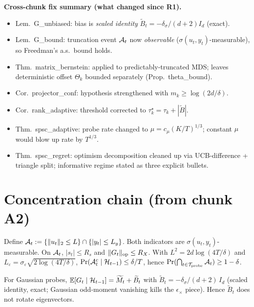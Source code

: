 \textbf{Cross-chunk fix summary (what changed since R1).}
\begin{itemize}[leftmargin=*,itemsep=1pt,topsep=1pt]
\item Lem.\ G\_unbiased: bias is \emph{scaled identity}
  $\widetilde B_t=-\delta_\sigma/(d+2)I_d$ (exact).
\item Lem.\ G\_bound: truncation event $\mathcal{A}_t$ now \emph{observable}
  ($\sigma(u_t,y_t)$-measurable), so Freedman's a.s.\ bound holds.
\item Thm.\ matrix\_bernstein: applied to predictably-truncated MDS;
  leaves deterministic offset $\Theta_k$ bounded separately
  (Prop.\ theta\_bound).
\item Cor.\ projector\_conf: hypothesis strengthened with
  $m_k\ge\log(2d/\delta)$.
\item Cor.\ rank\_adaptive: threshold corrected to
  $\tau_k^\star=\tau_k+|\widetilde B|$.
\item Thm.\ spsc\_adaptive: probe rate changed to
  $\mu=c_\mu(K/T)^{1/3}$; constant $\mu$ would blow up rate by $T^{1/3}$.
\item Thm.\ spsc\_regret: optimism decomposition cleaned up via
  UCB-difference + triangle split; informative regime stated as three
  explicit bullets.
\end{itemize}

\section{Concentration chain (from chunk A2)}

\begin{lemma}
\label{lem:G_bound}
Define $\mathcal{A}_t := \{\|u_t\|_2\le L\}\cap\{|y_t|\le L_y\}$. Both indicators
are $\sigma(u_t,y_t)$-measurable. On $\mathcal{A}_t$, $|s_t|\le R_s$ and
$\|G_t\|_{\mathrm{op}}\le R_X$. With $L^2=2d\log(4T/\delta)$ and
$L_\varepsilon=\sigma_\varepsilon\sqrt{2\log(4T/\delta)}$,
$\Pr(\mathcal{A}_t^c\mid\mathcal{H}_{t-1})\le\delta/T$, hence
$\Pr(\bigcap_{t\in\mathcal{T}_{\mathrm{probe}}}\mathcal{A}_t)\ge 1-\delta$.
\end{lemma}

\begin{lemma}
\label{lem:G_unbiased}
For Gaussian probes, $\mathbb{E}[G_t\mid\mathcal{H}_{t-1}] = \widetilde M_t + \widetilde B_t$
with $\widetilde B_t = -\delta_\sigma/(d+2)\,I_d$ (scaled identity,
exact; Gaussian odd-moment vanishing kills the $\epsilon_\times$ piece).
Hence $\widetilde B_t$ does not rotate eigenvectors.
\end{lemma}


